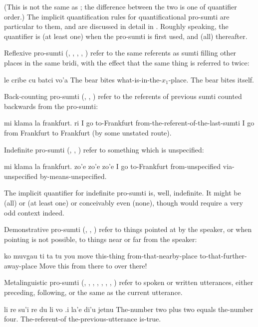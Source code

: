(This is not the same as ;
    the difference between the two is one of quantifier order.) The
    implicit quantification rules for quantificational pro-sumti
    are particular to them, and are discussed in detail in . Roughly speaking, the
    quantifier is  (at least one) when the pro-sumti is
    first used, and  (all) thereafter. 

Reflexive pro-sumti (, , , ,
    ) refer to the same referents as sumti filling other
    places in the same bridi, with the effect that the same thing
    is referred to twice:
\begin{example}
le cribe cu batci vo'a\n
The bear bites what-is-in-the-$x_1$-place.\n
The bear bites itself.
\end{example}

Back-counting pro-sumti (, , ) refer to the
    referents of previous sumti counted backwards from the
    pro-sumti:
\begin{example}
mi klama la frankfurt. ri\n
I go to-Frankfurt from-the-referent-of-the-last-sumti\n
I go from Frankfurt to Frankfurt (by some unstated route).
\end{example}

Indefinite pro-sumti (, , ) refer to
    something which is unspecified:
\begin{example}
mi klama la frankfurt. zo'e zo'e zo'e\n
I go to-Frankfurt from-unspecified via-unspecified\n
\T	by-means-unspecified.
\end{example}

The implicit quantifier for indefinite pro-sumti is, well,
    indefinite. It might be  (all) or  (at least one)
    or conceivably even  (none), though  would require
    a very odd context indeed. 

Demonstrative pro-sumti (, , ) refer to
    things pointed at by the speaker, or when pointing is not
    possible, to things near or far from the speaker:
\begin{example}
ko muvgau ti ta tu\n
you  move this-thing from-that-nearby-place\n
\T	to-that-further-away-place\n
Move this from there to over there!
\end{example}

Metalinguistic pro-sumti (, , ,
    , , , , ) refer to
    spoken or written utterances, either preceding, following, or
    the same as the current utterance.
\begin{example}
li re su'i re du li vo\n
\T	.i la'e di'u jetnu\n
The-number two plus two equals the-number four.\n
\T	The-referent-of the-previous-utterance is-true.
\end{example}

